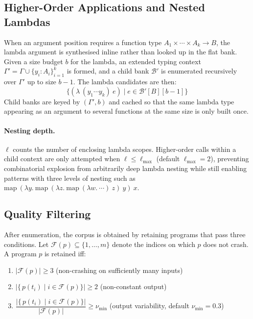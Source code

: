 \documentclass[11pt,a4paper]{article}
\begin{document}
\subsection{Higher-Order Applications and Nested Lambdas}\label{sec:ho-apps}

When an argument position requires a function type $A_1 \times \cdots \times A_k \to B$,
the lambda argument is synthesised inline rather than looked up in the flat bank. Given a size
budget $b$ for the lambda, an extended typing context
$\Gamma' = \Gamma \cup \{y_i : A_i\}_{i=1}^k$ is formed, and a child bank $\mathcal{B}'$
is enumerated recursively over $\Gamma'$ up to size $b - 1$. The lambda candidates are
then:
\[
  \bigl\{(\lambda\ (y_1 \cdots y_k)\ e) \;\big|\; e \in \mathcal{B}'[B][b-1]\bigr\}
\]
Child banks are keyed by $(\Gamma', b)$ and cached so that the same lambda type appearing
as an argument to several functions at the same size is only built once.

\paragraph{Nesting depth.}
$\ell$ counts the number of enclosing lambda scopes. Higher-order calls within a child
context are only attempted when $\ell \leq \ell_{\max}$ (default $\ell_{\max} = 2$),
preventing combinatorial explosion from arbitrarily deep lambda nesting while still
enabling patterns with three levels of nesting such as
$\mathrm{map}\ (\lambda y.\ \mathrm{map}\ (\lambda z.\ \mathrm{map}\ (\lambda w.\ \cdots)\ z)\ y)\ x$.

\subsection{Quality Filtering}\label{sec:quality}

After enumeration, the corpus is obtained by retaining programs that pass three
conditions. Let $\mathcal{F}(p) \subseteq \{1,\ldots,m\}$ denote the indices on which
$p$ does not crash. A program $p$ is retained iff:
\begin{enumerate}
  \item $|\mathcal{F}(p)| \geq 3$ \quad (non-crashing on sufficiently many inputs)
  \item $|\{\,p(t_i) \mid i \in \mathcal{F}(p)\}| \geq 2$ \quad (non-constant output)
  \item $\dfrac{|\{\,p(t_i) \mid i \in \mathcal{F}(p)\}|}{|\mathcal{F}(p)|}
        \geq \nu_{\min}$ \quad (output variability, default $\nu_{\min} = 0.3$)
\end{enumerate}
\end{document}
